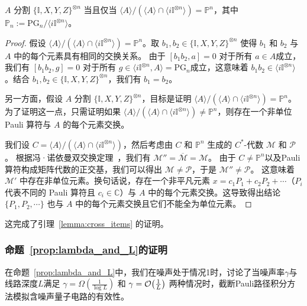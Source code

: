     
\begin{lemma}\label{ap:lemma:split_generate}
    $A$ 分割 $\{\mathbb{I},X,Y,Z\}^{\otimes n}$ 当且仅当 $\langle A\rangle/\left(\langle A\rangle\cap\langle i\mathbb{I}^{\otimes n}\rangle\right)=\mathbb{P}^n$，其中 $\mathbb{P}_n:=\mathrm{PG}_n/\langle i\mathbb{I}^{\otimes n}\rangle$。
\end{lemma}
\begin{proof}
    假设 $\langle A\rangle/\left(\langle A\rangle\cap\langle i\mathbb{I}^{\otimes n}\rangle\right)=\mathbb{P}^n$。取 $b_1,b_2\in \{\mathbb{I},X,Y,Z\}^{\otimes n}$ 使得 $b_1$ 和 $b_2$ 与 $A$ 中的每个元素具有相同的交换关系。
    由于 $\left[b_1b_2,a\right]=0$ 对于所有 $a\in A$成立，我们有 $\left[b_1b_2,g\right]=0$ 对于所有 $g\in\langle i\mathbb{I}^{\otimes n},A\rangle=\mathrm{PG}_n$成立，这意味着 $b_1b_2\in\langle i\mathbb{I}^{\otimes n}\rangle$。结合 $b_1,b_2\in \{\mathbb{I},X,Y,Z\}^{\otimes n}$，我们有 $b_1=b_2$。
    
    另一方面，假设 $A$ 分割 $\{\mathbb{I},X,Y,Z\}^{\otimes n}$，目标是证明 $\langle A\rangle/\left(\langle A\rangle\cap\langle i\mathbb{I}^{\otimes n}\rangle\right)=\mathbb{P}^n$。
    为了证明这一点，只需证明如果 $\langle A\rangle/\left(\langle A\rangle\cap\langle i\mathbb{I}^{\otimes n}\rangle\right)\neq\mathbb{P}^n$，则存在一个非单位 Pauli 算符与 $A$ 的每个元素交换。
    
    我们设 $C=\langle A\rangle/\left(\langle A\rangle\cap\langle i\mathbb{I}^{\otimes n}\rangle\right)$，然后考虑由 $C$ 和 $\mathbb{P}^n$ 生成的 $C^*$-代数 $\mathcal{M}$ 和 $\mathcal{P}$。
    根据冯·诺依曼双交换定理~\cite{kadison1986fundamentals}，我们有 $\mathcal{M}''=\overline{\mathcal{M}}=\mathcal{M}$。
    由于 $C\neq\mathbb{P}^n$以及Pauli 算符构成矩阵代数的正交基，我们可以得出 $\mathcal{M}\neq \mathcal{P}$，于是 $\mathcal{M}''\neq \mathcal{P}$。
    这意味着 $\mathcal{M}'$ 中存在非单位元素。换句话说，存在一个非平凡元素 $x=c_1P_1+c_2P_2+\cdots$（$P_i$ 代表不同的 Pauli 算符且 $c_i\in \mathbb{C}$）与 $A$ 中的每个元素交换。这导致得出结论 $\{P_1,P_2,\cdots\}$ 也与 $A$ 中的每个元素交换且它们不能全为单位元素。
\end{proof}
    
这完成了引理~\ref{lemma:cross_items} 的证明。

\subsubsection{命题~\ref{prop:lambda_and_L}的证明}

在命题~\ref{prop:lambda_and_L}中，我们在噪声处于情况1时，讨论了当噪声率$\gamma$与线路深度$L$满足 $\gamma=\Omega(\frac{1}{\log L})$ 和 $\gamma=\order{\frac{1}{L}}$ 两种情况时，截断Pauli路径积分方法模拟含噪声量子电路的有效性。


